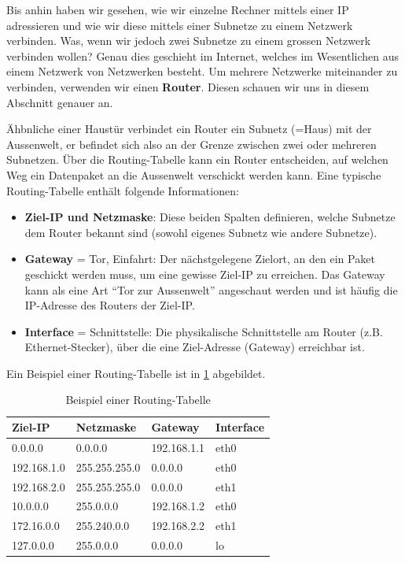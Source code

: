 Bis anhin haben wir gesehen, wie wir einzelne Rechner mittels einer IP adressieren und wie wir diese mittels einer Subnetze zu einem Netzwerk verbinden. Was, wenn wir jedoch zwei Subnetze zu einem grossen Netzwerk verbinden wollen? Genau dies geschieht im Internet, welches im Wesentlichen aus einem Netzwerk von Netzwerken besteht. Um mehrere Netzwerke miteinander zu verbinden, verwenden wir einen \textbf{Router}. Diesen schauen wir uns in diesem Abschnitt genauer an.

Ähbnliche einer Haustür verbindet ein Router ein Subnetz (=Haus) mit der Aussenwelt, er befindet sich also an der Grenze zwischen zwei oder mehreren Subnetzen. Über die Routing-Tabelle kann ein Router entscheiden, auf welchen Weg ein Datenpaket an die Aussenwelt verschickt werden kann. Eine typische Routing-Tabelle enthält folgende Informationen:

\begin{itemize}
	\item \textbf{Ziel-\gls{IP} und Netzmaske}: Diese beiden Spalten definieren, welche Subnetze dem Router bekannt sind (sowohl eigenes Subnetz wie andere Subnetze).
	\item \textbf{Gateway} = Tor, Einfahrt: Der nächstgelegene Zielort, an den ein Paket geschickt werden muss, um eine gewisse Ziel-\gls{IP} zu erreichen. Das Gateway kann als eine Art ``Tor zur Aussenwelt'' angeschaut werden und ist häufig die \gls{IP}-Adresse des Routers der Ziel-\gls{IP}.
	\item \textbf{Interface} = Schnittstelle: Die physikalische Schnittstelle am Router (z.B. Ethernet-Stecker), über die eine Ziel-Adresse (Gateway) erreichbar ist.
\end{itemize}

Ein Beispiel einer Routing-Tabelle ist in \cref{table:routing} abgebildet.

\begin{table}[H]
	\centering
	\begin{tabular}{ l | l || l | l}
		\textbf{Ziel-IP} & \textbf{Netzmaske} & \textbf{Gateway} & \textbf{Interface} \\
		\midrule\midrule
		0.0.0.0          & 0.0.0.0            & 192.168.1.1      & eth0               \\
		192.168.1.0      & 255.255.255.0      & 0.0.0.0          & eth0               \\
		192.168.2.0      & 255.255.255.0      & 0.0.0.0          & eth1               \\
		10.0.0.0         & 255.0.0.0          & 192.168.1.2      & eth0               \\
		172.16.0.0       & 255.240.0.0        & 192.168.2.2      & eth1               \\
		127.0.0.0        & 255.0.0.0          & 0.0.0.0          & lo                 \\
	\end{tabular}
	\caption{Beispiel einer Routing-Tabelle}
	\label{table:routing}
\end{table}



